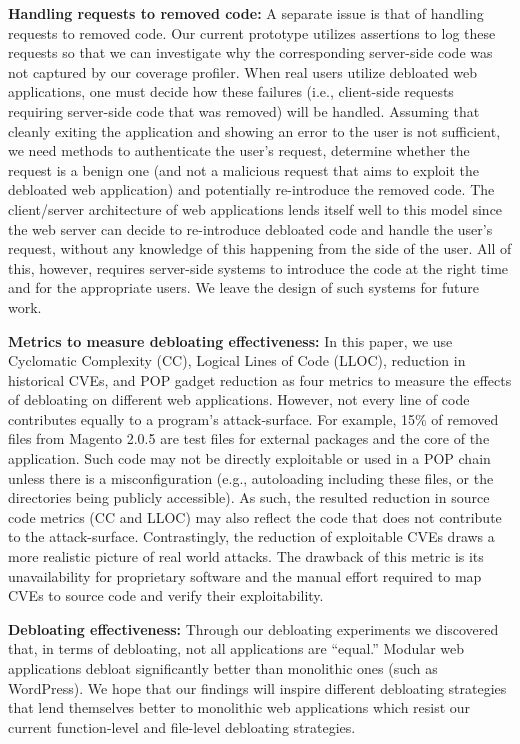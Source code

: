 \vspace{1ex}
\noindent\textbf{Handling requests to removed code:}
A separate issue is that of handling requests to removed code. Our
current prototype utilizes assertions to log these requests so that we can
investigate why the corresponding server-side code was not captured by our
coverage profiler. When real users utilize debloated web applications,
one must decide how these failures (i.e., client-side requests requiring
server-side code that was removed) will be handled. Assuming that cleanly
exiting the application and showing an error to the user is not sufficient,
we need methods to authenticate the user's request, determine whether the
request is a benign one (and not a malicious request that aims to exploit
the debloated web application) and potentially re-introduce the removed
code. The client/server architecture of web applications lends itself well
to this model since the web server can decide to re-introduce debloated code
and handle the user's request, without any knowledge of this happening from
the side of the user. All of this, however, requires server-side systems
to introduce the code at the right time and for the appropriate users. We
leave the design of such systems for future work.

\vspace{1ex}
\noindent\textbf{Metrics to measure debloating effectiveness:}
In this paper, we use Cyclomatic Complexity (CC), Logical Lines of Code
(LLOC), reduction in historical CVEs, and POP gadget reduction as four metrics to measure the
effects of debloating on different web applications. However, not every line of code
contributes equally to a program's attack-surface. For example, 15\% of removed
files from Magento 2.0.5 are test files for external packages and
the core of the application. Such code may not be directly exploitable or
used in a POP chain unless there is a misconfiguration (e.g., autoloading
including these files, or the directories being publicly accessible). As such,
the resulted reduction in source code metrics (CC and LLOC) may also reflect the code
that does not contribute to the attack-surface.
Contrastingly, the reduction of exploitable CVEs draws a more realistic picture
of real world attacks. The drawback of this metric is its unavailability for
proprietary software and the manual effort required to map CVEs to source
code and verify their exploitability.

\vspace{1ex}
\noindent\textbf{Debloating effectiveness:}
Through our debloating experiments we discovered that, in terms of debloating,
not all applications are ``equal.'' Modular web applications debloat
significantly better than monolithic ones (such as WordPress). We hope that
our findings will inspire different debloating strategies that lend themselves
better to monolithic web applications which resist our current function-level
and file-level debloating strategies.




